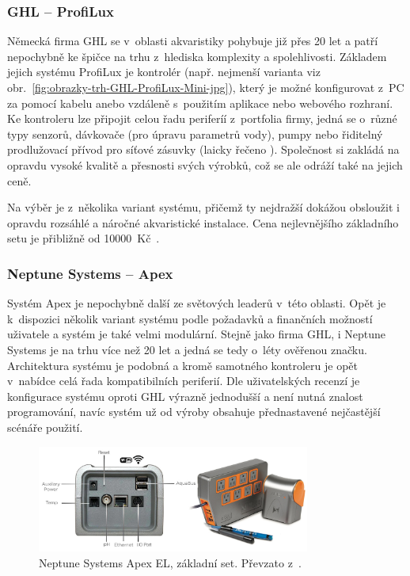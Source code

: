         \subsubsection{GHL -- ProfiLux}
            Německá firma GHL se v~oblasti akvaristiky pohybuje již přes 20 let a patří nepochybně ke špičce na trhu z~hlediska komplexity a spolehlivosti. Základem jejich systému ProfiLux je kontrolér (např. nejmenší varianta viz obr.~\ref{fig:obrazky-trh-GHL-ProfiLux-Mini-jpg}), který je možné konfigurovat z~PC za pomocí kabelu anebo vzdáleně s~použitím aplikace nebo webového rozhraní. Ke kontroleru lze připojit celou řadu periferíí z~portfolia firmy, jedná se o~různé typy senzorů, dávkovače (pro úpravu parametrů vody), pumpy nebo řiditelný prodlužovací přívod pro síťové zásuvky (laicky řečeno ). Společnost si zakládá na opravdu vysoké kvalitě a přesnosti svých výrobků, což se ale odráží také na jejich ceně. 

            Na výběr je z~několika variant systému, přičemž ty nejdražší dokážou obsloužit i opravdu rozsáhlé a náročné akvaristické instalace. Cena nejlevnějšího základního setu je přibližně od \qty{10000}{Kč}~\cite{ghl-profilux,eshop-ghl-profilux-sets}.

            
        \subsubsection{Neptune Systems -- Apex}
            Systém Apex je nepochybně další ze světových leaderů v~této oblasti. Opět je k~dispozici několik variant systému podle požadavků a finančních možností uživatele a systém je také velmi modulární. Stejně jako firma GHL, i Neptune Systems je na trhu více než 20 let a jedná se tedy o~léty ověřenou značku. Architektura systému je podobná a kromě samotného kontroleru je opět v~nabídce celá řada kompatibilních periferií. Dle uživatelských recenzí je konfigurace systému oproti GHL výrazně jednodušší a není nutná znalost programování, navíc systém už od výroby obsahuje přednastavené nejčastější scénáře použití.

            \begin{figure}[h!]
                \centering
                \includegraphics[width=0.8\textwidth]{obrazky/trh/apex-el.jpg}
                \caption{Neptune Systems Apex EL, základní set. Převzato z~\cite{eshop-neptune-systems-apex}.}
                \label{fig:obrazky-trh-apex-el}
            \end{figure}
            
